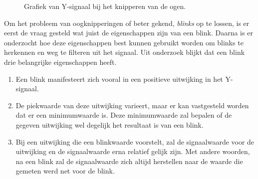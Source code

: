 \documentclass{article}
\newcommand{\figwidth}{0.75\linewidth}
\begin{document}
\begin{figure}[H]
	\centering
	\caption{Grafiek van Y-signaal bij het knipperen van de ogen.}
	\label{fig:blinksnotfiltered}
\end{figure}
Om het probleem van oogknipperingen of beter gekend, \textit{blinks }op te lossen, is er eerst de vraag gesteld wat juist de eigenschappen zijn van een blink. Daarna is er onderzocht hoe deze eigenschappen best kunnen gebruikt worden om blinks te herkennen en weg te filteren uit het signaal. Uit onderzoek \cite{Bulling:eyeanalysis} blijkt dat een blink drie belangrijke eigenschappen heeft. 
\begin{enumerate}
	\item Een blink manifesteert zich vooral in een positieve uitwijking in het Y-signaal.
	\item De piekwaarde van deze uitwijking varieert, maar er kan vastgesteld worden dat er een minimumwaarde is. Deze minimumwaarde zal bepalen of de gegeven uitwijking wel degelijk het resultaat is van een blink.
	\item Bij een uitwijking die een blinkwaarde voorstelt, zal de signaalwaarde voor de uitwijking en de signaalwaarde erna relatief gelijk zijn. Met andere woorden, na een blink zal de signaalwaarde zich altijd herstellen naar de waarde die gemeten werd net voor de blink.
\end{enumerate}
\end{document}
